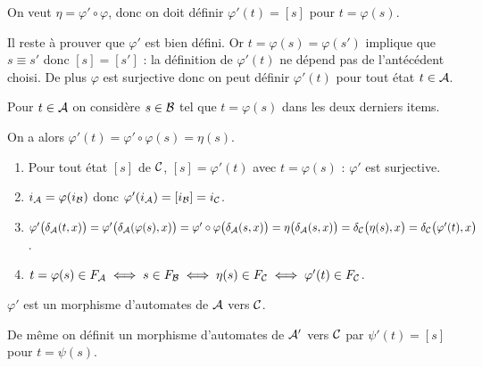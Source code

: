 \begin{Exercise}[label=ques:coprod2]
On veut $\eta = \varphi' \circ \varphi$, donc on doit définir $\varphi'(t) = [s]$ pour $t=\varphi(s)$.

Il reste à prouver que $\varphi'$ est bien défini. Or $t = \varphi(s) = \varphi(s')$ implique que $s\equiv s'$ donc $[s] = [s']$ : la définition de $\varphi'(t)$ ne dépend pas de l’antécédent choisi. De plus $\varphi$ est surjective donc on peut définir $\varphi'(t)$ pour tout état $t\in {\cal A}$.

\medskip

Pour $t\in {\cal A}$ on considère $s\in {\cal B}$ tel que $t=\varphi(s)$ dans les deux derniers items.

On a alors $\varphi'(t) = \varphi'\circ \varphi(s) = \eta(s)$.

\begin{enumerate}
\item Pour tout état $[s]$ de ${\cal C}$, $[s] = \varphi'(t)$ avec $t=\varphi(s)$ : $\varphi'$ est surjective.
\item $i_{\cal A} = \varphi(i_{\cal B})$ donc $\varphi'(i_{\cal A}) = [i_{\cal B}] = i_{\cal C}$.
\item $\varphi'\bigl(\delta_{\cal A}(t, x)\bigr) = \varphi'\bigl(\delta_{\cal A}(\varphi(s), x)\bigr)
=\varphi'\circ \varphi \bigl(\delta_{\cal A}(s, x)\bigr)
=\eta\bigl(\delta_{\cal A}(s, x)\bigr)
=\delta_{\cal C}\bigl(\eta(s), x\bigr)
= \delta_{\cal C}\bigl(\varphi'(t), x\bigr)$.
\item $t = \varphi(s)\in F_{\cal A} \iff s \in F_{\cal B} \iff \eta(s) \in F_{\cal C}  \iff \varphi'(t) \in F_{\cal C}$.
\end{enumerate}
$\varphi'$ est un morphisme d'automates de ${\cal A}$ vers ${\cal C}$.

\medskip

De même on définit un morphisme d'automates de ${\cal A}'$ vers ${\cal C}$ par $\psi'(t) = [s]$ pour $t = \psi(s)$.
\end{Exercise}
\newpage

